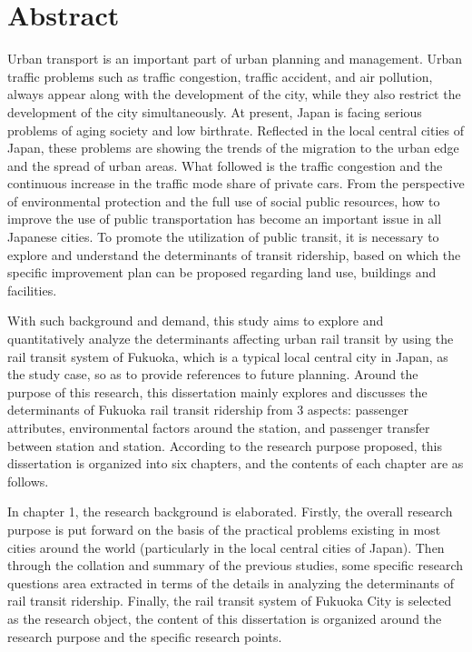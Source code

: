 \documentclass[12pt, twoside, a4paper]{book} %
\begin{document}
\chapter{Abstract}
Urban transport is an important part of urban planning and management. Urban traffic problems such as traffic congestion, traffic accident, and air pollution, always appear along with the development of the city, while they also restrict the development of the city simultaneously. At present, Japan is facing serious problems of aging society and low birthrate. Reflected in the local central cities of Japan, these problems are showing the trends of the migration to the urban edge and the spread of urban areas. What followed is the traffic congestion and the continuous increase in the traffic mode share of private cars. From the perspective of environmental protection and the full use of social public resources, how to improve the use of public transportation has become an important issue in all Japanese cities. To promote the utilization of public transit, it is necessary to explore and understand the determinants of transit ridership, based on which the specific improvement plan can be proposed regarding land use, buildings and facilities.

With such background and demand, this study aims to explore and quantitatively analyze the determinants affecting urban rail transit by using the rail transit system of Fukuoka, which is a typical local central city in Japan, as the study case, so as to provide references to future planning. Around the purpose of this research, this dissertation mainly explores and discusses the determinants of Fukuoka rail transit ridership from 3 aspects: passenger attributes, environmental factors around the station, and passenger transfer between station and station. According to the research purpose proposed, this dissertation is organized into six chapters, and the contents of each chapter are as follows. 

In chapter 1, the research background is elaborated. Firstly,  the overall research purpose is put forward on the basis of the practical problems existing in most cities around the world (particularly in the local central cities of Japan). Then through the collation and summary of the previous studies, some specific research questions area extracted in terms of the details in analyzing the determinants of rail transit ridership. Finally, the rail transit system of Fukuoka City is selected as the research object, the content of this dissertation is organized around the research purpose and the specific research points.
\end{document}
